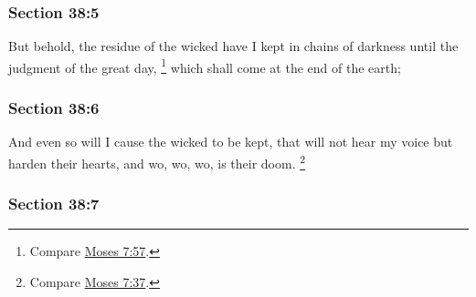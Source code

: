 
	\subsubsection{Section 38:5} %
		\label{DC38-5}

		But behold, the residue of the wicked have I kept in chains of darkness until the judgment of the great day,%
			\footnote{%
				Compare \hyperref[MOSES-7-57]{Moses 7:57}.
				} 
		which shall come at the end of the earth;


	\subsubsection{Section 38:6} %
		\label{DC38-6}

		And even so will I cause the wicked to be kept, that will not hear my voice but harden their hearts, and wo, wo, wo, is their doom.%
			\footnote{%
				Compare \hyperref[MOSES-7-37]{Moses 7:37}.
				}


	\subsubsection{Section 38:7} %
		\label{DC38-7}

